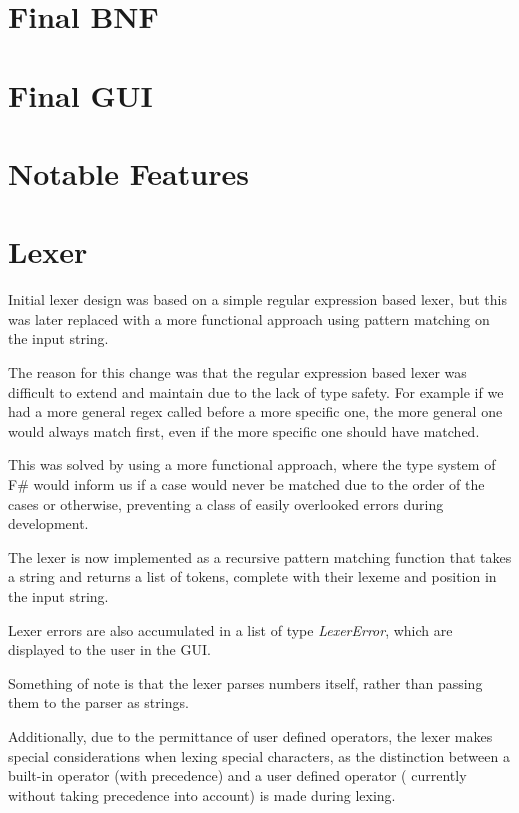 \section{Final BNF}\label{sec:final-bnf}


\section{Final GUI}\label{sec:final-gui}

\section{Notable Features}\label{sec:notable-features}

\section{Lexer}\label{sec:lexer}

Initial lexer design was based on a simple regular expression based lexer, but this was later replaced with a more
functional approach using pattern matching on the input string.

The reason for this change was that the regular expression based lexer was difficult to extend and maintain due to 
the lack of type safety.
For example if we had a more general regex called before a more specific one, the more general one would always match
first, even if the more specific one should have matched.

This was solved by using a more functional approach, where the type system of F\# would inform us if a case would 
never be matched due to the order of the cases or otherwise, preventing a class of easily overlooked errors during development.

The lexer is now implemented as a recursive pattern matching function that takes a string and returns a list of 
tokens, complete with their lexeme and position in the input string.

Lexer errors are also accumulated in a list of type \textit{LexerError}, which are displayed to the user in the GUI\@.

Something of note is that the lexer parses numbers itself, rather than passing them to the parser as strings.

Additionally, due to the permittance of user defined operators, the lexer makes special considerations when lexing 
special characters, as the distinction between a built-in operator (with precedence) and a user defined operator (
currently without taking precedence into account) is made during lexing.

